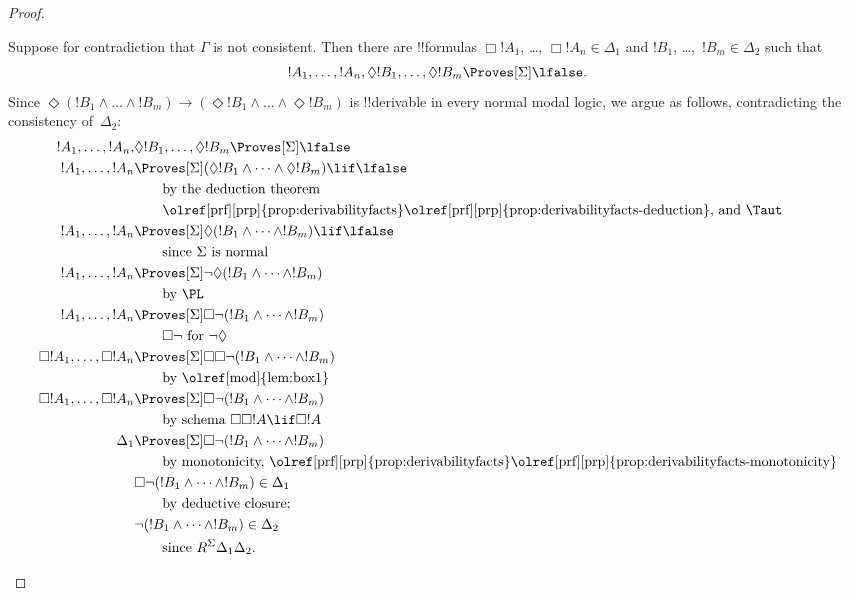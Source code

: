 \documentclass[../../../include/open-logic-section]{subfiles}
\begin{document}
\begin{proof}
\begin{enumerate}
    Suppose for contradiction that $\Gamma$ is not consistent. Then
    there are !!{formula}s $\Box!A_1$, \dots, $\Box!A_n \in \Delta_1$
    and $!B_1$, \dots,~$!B_m \in \Delta_2$ such that \[!A_1, \dots,
    !A_n, \Diamond!B_1, \dots, \Diamond!B_m \Proves[\Sigma]
    \lfalse.\] Since $\Diamond (!B_1 \land \dots \land !B_m) \to
    (\Diamond!B_1 \land \dots \land \Diamond!B_m)$ is !!{derivable} in
    every normal modal logic, we argue as follows, contradicting the
    consistency of~$\Delta_2$:
    \begin{align*}
      !A_1, \dots, !A_n, & \Diamond!B_1, \dots,
      \Diamond!B_m \Proves[\Sigma] \lfalse \\
      !A_1, \dots,!A_n & \Proves[\Sigma] (\Diamond!B_1 \land
      \dots \land \Diamond!B_m) \lif \lfalse\\
      & \qquad\text{by the deduction theorem}\\
      & \qquad\text{\olref[prf][prp]{prop:derivabilityfacts}\olref[prf][prp]{prop:derivabilityfacts-deduction}, and \Taut} \\
      !A_1, \dots,!A_n & \Proves[\Sigma]
      \Diamond(!B_1 \land
      \dots \land !B_m) \lif \lfalse\\
      & \qquad \text{since $\Sigma$ is normal} \\
      !A_1, \dots,!A_n & \Proves[\Sigma]
      \lnot\Diamond (!B_1 \land \dots \land !B_m)\\
      & \qquad\text{by \PL} \\
      !A_1, \dots,!A_n & \Proves[\Sigma]
      \Box\lnot (!B_1 \land \dots \land !B_m)\\
      & \qquad\text{$\Box\lnot$ for $\lnot\Diamond$} \\
      \Box!A_1, \dots,\Box!A_n
      & \Proves[\Sigma] \Box\Box \lnot (!B_1 \land \dots \land !B_m)\\
      & \qquad\text{by \olref[mod]{lem:box1}} \\
      \Box!A_1, \dots,\Box!A_n
      & \Proves[\Sigma]
      \Box\lnot (!B_1 \land \dots \land !B_m)\\
      &\qquad\text{by schema $\Box\Box!A \lif \Box!A$} \\
      \Delta_1 & \Proves[\Sigma]
      \Box\lnot (!B_1 \land \dots \land !B_m)\\
      &\qquad\text{by monotonicity, \olref[prf][prp]{prop:derivabilityfacts}\olref[prf][prp]{prop:derivabilityfacts-monotonicity}} \\
      & \Box\lnot (!B_1 \land \dots \land !B_m) \in \Delta_1\\
      &\qquad\text{by deductive closure}; \\
      & \lnot (!B_1 \land \dots \land !B_m) \in \Delta_2\\
      &\qquad \text{since }
      R^\Sigma \Delta_1\Delta_2. 
    \end{align*}
  \end{enumerate}
\end{proof}
\end{document}
